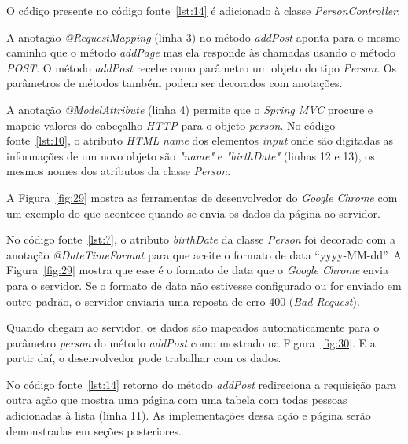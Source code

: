 O código presente no código fonte~\ref{lst:14} é adicionado à classe \textit{PersonController}:


A anotação \textit{@RequestMapping} (linha 3) no método \textit{addPost} aponta para o mesmo caminho que o método \textit{addPage} mas ela responde às chamadas usando o método \textit{POST}. O método \textit{addPost} recebe como parâmetro um objeto do tipo \textit{Person}. Os parâmetros de métodos também podem ser decorados com anotações.

A anotação \textit{@ModelAttribute} (linha 4) permite que o \textit{Spring MVC} procure e mapeie valores do cabeçalho \textit{HTTP} para o objeto \textit{person}. No código fonte~\ref{lst:10}, o atributo \textit{HTML} \textit{name} dos elementos \textit{input} onde são digitadas as informações de um novo objeto são \textit{"name"} e \textit{"birthDate"} (linhas 12 e 13), os mesmos nomes dos atributos da classe \textit{Person}.

A Figura~\ref{fig:29} mostra as ferramentas de desenvolvedor do \textit{Google Chrome} com um exemplo do que acontece quando se envia os dados da página ao servidor.


No código fonte~\ref{lst:7}, o atributo \textit{birthDate} da classe \textit{Person} foi decorado com a anotação \textit{@DateTimeFormat} para que aceite o formato de data “yyyy-MM-dd”. A Figura~\ref{fig:29} mostra que esse é o formato de data que o \textit{Google Chrome} envia para o servidor. Se o formato de data não estivesse configurado ou for enviado em outro padrão, o servidor enviaria uma reposta de erro 400 (\textit{Bad Request}).

Quando chegam ao servidor, os dados são mapeados automaticamente para o parâmetro \textit{person} do método \textit{addPost} como mostrado na Figura~\ref{fig:30}. E a partir daí, o desenvolvedor pode trabalhar com os dados.


No código fonte~\ref{lst:14} retorno do método \textit{addPost} redireciona a requisição para outra ação que mostra uma página com uma tabela com todas pessoas adicionadas à lista (linha 11). As implementações dessa ação e página serão demonstradas em seções posteriores.

